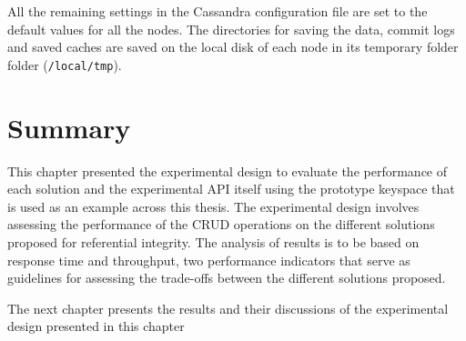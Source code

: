 All the remaining
settings in the Cassandra configuration file are set to the  default values
for all the nodes.  The directories for saving the data,  commit logs and saved
caches are saved on the local disk of each node in its temporary
folder folder (\texttt{/local/tmp}).










\section{Summary} \label{sexp:Summary} 

This chapter  presented the experimental design to evaluate the performance of
each  solution and the experimental \ac{API} itself using the prototype keyspace
that is used as an example across this thesis.  The experimental design involves
assessing the performance of the CRUD operations on the different solutions
proposed for referential integrity. 
The analysis of results is to be based on response time and throughput,  two
performance indicators that serve as guidelines for assessing the trade-offs
between the different solutions proposed. 
	
	
The next chapter presents the results and their discussions of the experimental
design presented in this chapter
 






